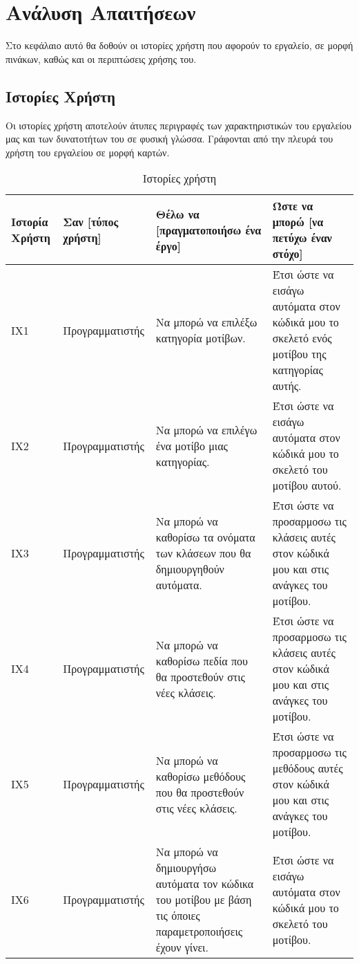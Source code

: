 \chapter{Ανάλυση Απαιτήσεων}
Στο κεφάλαιο αυτό θα δοθούν οι ιστορίες χρήστη που αφορούν το εργαλείο, σε μορφή πινάκων, καθώς  και οι περιπτώσεις χρήσης του.

\label{ch:requirmentAnalysis}
\section{Ιστορίες Χρήστη}
\label{sec:userStories}
Οι ιστορίες χρήστη αποτελούν  άτυπες περιγραφές  των χαρακτηριστικών του εργαλείου μας και των δυνατοτήτων του σε φυσική γλώσσα. Γράφονται από την πλευρά του χρήστη του εργαλείου σε μορφή καρτών.
\begin{table}[H]
	\hspace*{-0.2cm}
    \centering
    \scriptsize
    \caption{Ιστορίες χρήστη}
    \label{tab:userStories}
	\begin{tabular}{|p{1.5cm}|p{3.5cm}|p{4.5cm}|p{4.7cm}|}
    \hline
        \textbf{Ιστορία Χρήστη} & \textbf{Σαν [τύπος χρήστη]} & \textbf{Θέλω να [πραγματοποιήσω ένα έργο]} & \textbf{Ώστε να μπορώ [να πετύχω έναν στόχο]} \\ \hline     \hline
        ΙΧ1 & Προγραμματιστής & Να μπορώ να επιλέξω κατηγορία μοτίβων. & Έτσι ώστε να εισάγω αυτόματα στον κώδικά μου το σκελετό ενός μοτίβου της κατηγορίας αυτής. \\ \hline
        ΙΧ2 & Προγραμματιστής & Να μπορώ να επιλέγω ένα μοτίβο μιας κατηγορίας. & Έτσι ώστε να  εισάγω αυτόματα στον κώδικά μου το σκελετό του μοτίβου αυτού. \\ \hline
        ΙΧ3 & Προγραμματιστής & Να μπορώ να καθορίσω τα ονόματα των κλάσεων που θα δημιουργηθούν αυτόματα. & Έτσι ώστε να προσαρμοσω τις κλάσεις αυτές στον κώδικά μου και στις ανάγκες του μοτίβου. \\ \hline
        ΙΧ4 & Προγραμματιστής & Να μπορώ να καθορίσω πεδία που θα προστεθούν στις νέες κλάσεις.  & Έτσι ώστε να προσαρμοσω τις κλάσεις αυτές στον κώδικά μου και στις ανάγκες του μοτίβου. \\ \hline
        ΙΧ5 & Προγραμματιστής & Να μπορώ να καθορίσω μεθόδους που θα προστεθούν στις νέες κλάσεις. & Έτσι ώστε να προσαρμοσω τις μεθόδους αυτές στον κώδικά μου και στις ανάγκες του μοτίβου. \\ \hline
        ΙΧ6 & Προγραμματιστής & Να μπορώ να δημιουργήσω αυτόματα τον κώδικα του μοτίβου με βάση τις όποιες παραμετροποιήσεις έχουν γίνει. & Έτσι ώστε να εισάγω αυτόματα στον κώδικά μου το σκελετό του μοτίβου. \\ \hline

\end{tabular}
\end{table}
